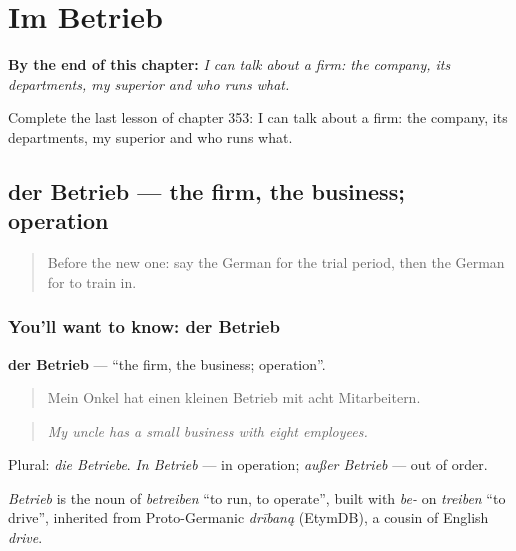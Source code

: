 
\chapter{Im Betrieb}
\label{ch:ge-im-betrieb}

\begin{chapteropening}
\textbf{By the end of this chapter:} \emph{I can talk about a firm: the company, its departments, my superior and who runs what.}

Complete the last lesson of chapter 353: I can talk about a firm: the company, its departments, my superior and who runs what.
\end{chapteropening}

\section[der Betrieb]{der Betrieb — the firm, the business; operation}

\label{lesson:GE-C353-betrieb}



\begin{quote}
Before the new one: say the German for the trial period, then the German for to train in.
\end{quote}

\subsection*{You'll want to know: der Betrieb}
\textbf{der Betrieb} — \textquotedblleft{}the firm, the business; operation\textquotedblright{}.

\begin{quote}
Mein Onkel hat einen kleinen Betrieb mit acht Mitarbeitern.
\end{quote}

\begin{quote}
\emph{My uncle has a small business with eight employees.}
\end{quote}

Plural: \emph{die Betriebe}. \emph{In Betrieb} — in operation; \emph{außer Betrieb} — out of order.

\begin{cousinweb}
\emph{Betrieb} is the noun of \emph{betreiben} \textquotedblleft{}to run, to operate\textquotedblright{}, built with \emph{be-} on \emph{treiben} \textquotedblleft{}to drive\textquotedblright{}, inherited from Proto-Germanic \emph{drībaną} (EtymDB), a cousin of English \emph{drive}.
\end{cousinweb}

